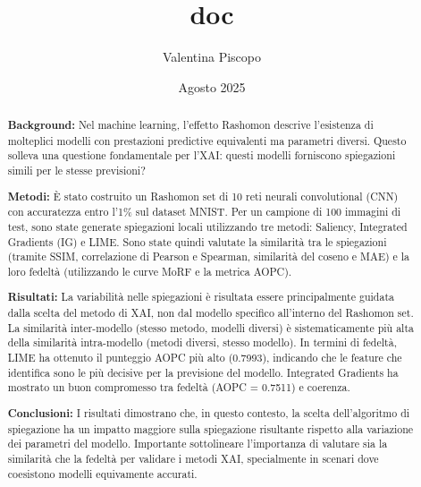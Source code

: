 \documentclass[12pt,a4paper,oneside]{report}
\title{doc}
\author{Valentina Piscopo}
\date{Agosto 2025}
\numberwithin{figure}{chapter}
\numberwithin{table}{chapter}
\begin{document}
\maketitle

\begin{abstract}
      \noindent
      \textbf{Background:} Nel machine learning, l'effetto Rashomon descrive l'esistenza di molteplici modelli con prestazioni predictive equivalenti ma parametri diversi. Questo solleva una questione fondamentale per l'XAI: questi modelli forniscono spiegazioni simili per le stesse previsioni?

      \vspace{0.5em}

      \noindent
      \textbf{Metodi:} È stato costruito un Rashomon set di 10 reti neurali convolutional (CNN) con accuratezza entro l'1\% sul dataset MNIST. Per un campione di 100 immagini di test, sono state generate spiegazioni locali utilizzando tre metodi: Saliency, Integrated Gradients (IG) e LIME. Sono state quindi valutate la similarità tra le spiegazioni (tramite SSIM, correlazione di Pearson e Spearman, similarità del coseno e MAE) e la loro fedeltà (utilizzando le curve MoRF e la metrica AOPC).

      \vspace{0.5em}

      \noindent
      \textbf{Risultati:} La variabilità nelle spiegazioni è risultata essere principalmente guidata dalla scelta del metodo di XAI, non dal modello specifico all'interno del Rashomon set. La similarità inter-modello (stesso metodo, modelli diversi) è sistematicamente più alta della similarità intra-modello (metodi diversi, stesso modello). In termini di fedeltà, LIME ha ottenuto il punteggio AOPC più alto (0.7993), indicando che le feature che identifica sono le più decisive per la previsione del modello. Integrated Gradients ha mostrato un buon compromesso tra fedeltà (AOPC = 0.7511) e coerenza.

      \vspace{0.5em}

      \noindent
      \textbf{Conclusioni:} I risultati dimostrano che, in questo contesto, la scelta dell'algoritmo di spiegazione ha un impatto maggiore sulla spiegazione risultante rispetto alla variazione dei parametri del modello. Importante sottolineare l'importanza di valutare sia la similarità che la fedeltà per validare i metodi XAI, specialmente in scenari dove coesistono modelli equivamente accurati.
\end{abstract}
\newpage
\end{document}
